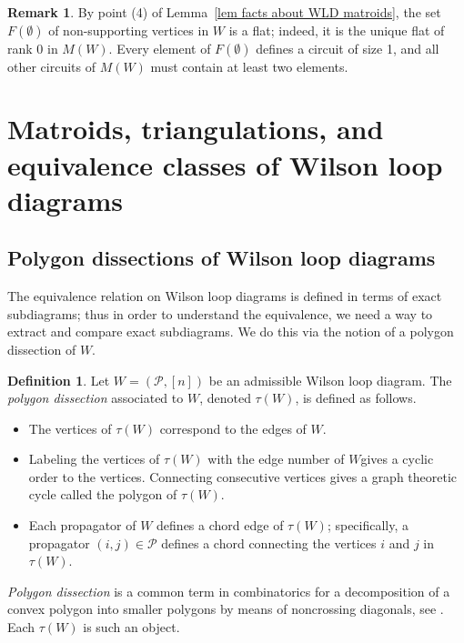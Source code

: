 \documentclass[11pt]{article}
\newcommand{\cP}{\mathcal{P}}
\theoremstyle{remark}
\theoremstyle{definition}
\newtheorem{dfn}[thm]{Definition}
\newtheorem{rmk}[thm]{Remark}
\begin{document}
\begin{rmk}
By point (4) of Lemma~\ref{lem facts about WLD matroids}, the set $F(\emptyset)$ of non-supporting vertices in $W$ is a flat; indeed, it is the unique flat of rank 0 in $M(W)$. Every element of $F(\emptyset)$ defines a circuit of size 1, and all other circuits of $M(W)$ must contain at least two elements.
\end{rmk}




\section{Matroids, triangulations, and equivalence classes of Wilson loop diagrams}\label{sec equiv}

\subsection{Polygon dissections of Wilson loop diagrams\label{sec: polygon partitions}}


The equivalence relation on Wilson loop diagrams is defined in terms of exact subdiagrams; thus in order to understand the equivalence, we need a way to extract and compare exact subdiagrams. We do this via the notion of a polygon dissection of $W$.

\begin{dfn}\label{WLDtriangulationdfn}
  Let $W = (\cP, [n])$ be an admissible Wilson loop diagram.  The \emph{polygon dissection} associated to $W$, denoted $\tau(W)$, is defined as follows.
  \begin{itemize}
  \item The vertices of $\tau(W)$ correspond to the edges of $W$.
  \item Labeling the vertices of $\tau(W)$ with the edge number of $W$gives a cyclic order to the vertices. Connecting consecutive vertices gives a graph theoretic cycle called the polygon of $\tau(W)$.
  \item Each propagator of $W$ defines a chord edge of $\tau(W)$; specifically,  a propagator $(i,j) \in \cP$ defines a chord connecting the vertices $i$ and $j$ in $\tau(W)$.
  \end{itemize}
\end{dfn}

\emph{Polygon dissection} is a common term in combinatorics for a decomposition of a convex polygon into smaller polygons by means of noncrossing diagonals, see \cite{PSpolygon}.  Each $\tau(W)$ is such an object.
\end{document}
